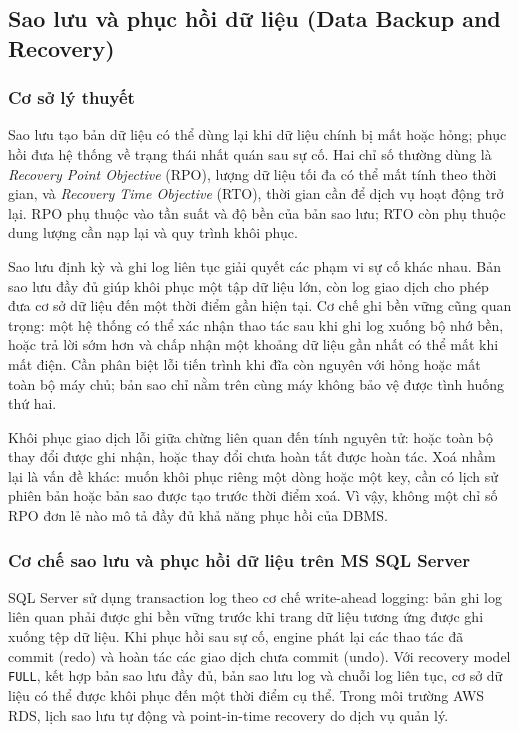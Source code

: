 \subsection{Sao lưu và phục hồi dữ liệu (Data Backup and Recovery)}
\label{subsec:backup-recovery}

\subsubsection{Cơ sở lý thuyết}

Sao lưu tạo bản dữ liệu có thể dùng lại khi dữ liệu chính bị mất hoặc hỏng; phục hồi đưa hệ thống về trạng thái nhất quán sau sự cố. Hai chỉ số thường dùng là \textit{Recovery Point Objective} (RPO), lượng dữ liệu tối đa có thể mất tính theo thời gian, và \textit{Recovery Time Objective} (RTO), thời gian cần để dịch vụ hoạt động trở lại. RPO phụ thuộc vào tần suất và độ bền của bản sao lưu; RTO còn phụ thuộc dung lượng cần nạp lại và quy trình khôi phục.

Sao lưu định kỳ và ghi log liên tục giải quyết các phạm vi sự cố khác nhau. Bản sao lưu đầy đủ giúp khôi phục một tập dữ liệu lớn, còn log giao dịch cho phép đưa cơ sở dữ liệu đến một thời điểm gần hiện tại. Cơ chế ghi bền vững cũng quan trọng: một hệ thống có thể xác nhận thao tác sau khi ghi log xuống bộ nhớ bền, hoặc trả lời sớm hơn và chấp nhận một khoảng dữ liệu gần nhất có thể mất khi mất điện. Cần phân biệt lỗi tiến trình khi đĩa còn nguyên với hỏng hoặc mất toàn bộ máy chủ; bản sao chỉ nằm trên cùng máy không bảo vệ được tình huống thứ hai.

Khôi phục giao dịch lỗi giữa chừng liên quan đến tính nguyên tử: hoặc toàn bộ thay đổi được ghi nhận, hoặc thay đổi chưa hoàn tất được hoàn tác. Xoá nhầm lại là vấn đề khác: muốn khôi phục riêng một dòng hoặc một key, cần có lịch sử phiên bản hoặc bản sao được tạo trước thời điểm xoá. Vì vậy, không một chỉ số RPO đơn lẻ nào mô tả đầy đủ khả năng phục hồi của DBMS.

\subsubsection{Cơ chế sao lưu và phục hồi dữ liệu trên MS SQL Server}

SQL Server sử dụng transaction log theo cơ chế write-ahead logging: bản ghi log liên quan phải được ghi bền vững trước khi trang dữ liệu tương ứng được ghi xuống tệp dữ liệu. Khi phục hồi sau sự cố, engine phát lại các thao tác đã commit (redo) và hoàn tác các giao dịch chưa commit (undo). Với recovery model \texttt{FULL}, kết hợp bản sao lưu đầy đủ, bản sao lưu log và chuỗi log liên tục, cơ sở dữ liệu có thể được khôi phục đến một thời điểm cụ thể. Trong môi trường AWS RDS, lịch sao lưu tự động và point-in-time recovery do dịch vụ quản lý.

